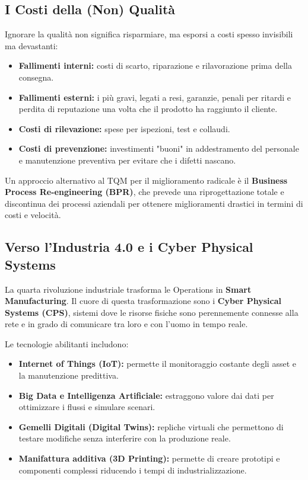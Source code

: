 \documentclass[a4paper,10pt]{article}
\begin{document}
\subsection*{I Costi della (Non) Qualità}

Ignorare la qualità non significa risparmiare, ma esporsi a costi spesso invisibili ma devastanti:
\begin{itemize}
    \item \textbf{Fallimenti interni:} costi di scarto, riparazione e rilavorazione prima della consegna.
    \item \textbf{Fallimenti esterni:} i più gravi, legati a resi, garanzie, penali per ritardi e perdita di reputazione una volta che il prodotto ha raggiunto il cliente.
    \item \textbf{Costi di rilevazione:} spese per ispezioni, test e collaudi.
    \item \textbf{Costi di prevenzione:} investimenti "buoni" in addestramento del personale e manutenzione preventiva per evitare che i difetti nascano.
\end{itemize}

Un approccio alternativo al TQM per il miglioramento radicale è il \textbf{Business Process Re-engineering (BPR)}, che prevede una riprogettazione totale e discontinua dei processi aziendali per ottenere miglioramenti drastici in termini di costi e velocità.

\subsection*{Verso l'Industria 4.0 e i Cyber Physical Systems}

La quarta rivoluzione industriale trasforma le Operations in \textbf{Smart Manufacturing}. Il cuore di questa trasformazione sono i \textbf{Cyber Physical Systems (CPS)}, sistemi dove le risorse fisiche sono perennemente connesse alla rete e in grado di comunicare tra loro e con l'uomo in tempo reale.

Le tecnologie abilitanti includono:
\begin{itemize}
    \item \textbf{Internet of Things (IoT):} permette il monitoraggio costante degli asset e la manutenzione predittiva.
    \item \textbf{Big Data e Intelligenza Artificiale:} estraggono valore dai dati per ottimizzare i flussi e simulare scenari.
    \item \textbf{Gemelli Digitali (Digital Twins):} repliche virtuali che permettono di testare modifiche senza interferire con la produzione reale.
    \item \textbf{Manifattura additiva (3D Printing):} permette di creare prototipi e componenti complessi riducendo i tempi di industrializzazione.
\end{itemize}
\end{document}
